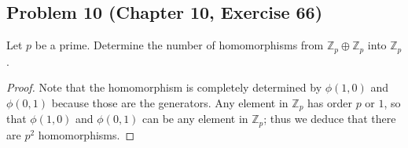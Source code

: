 \documentclass{article}
\begin{document}
\subsection*{Problem 10 (Chapter 10, Exercise 66)}
Let $p$ be a prime. Determine the number of homomorphisms from $\mathbb{Z}_p \oplus \mathbb{Z}_p$ into $\mathbb{Z}_p$.
\begin{proof}
Note that the homomorphism is completely determined by $\phi(1, 0)$ and $\phi(0, 1)$ because those are the generators. Any element in $\mathbb{Z}_p$ has order $p$ or $1$, so that $\phi(1, 0)$ and $\phi(0, 1)$ can be any element in $\mathbb{Z}_p$; thus we deduce that there are $p^2$ homomorphisms. 

\end{proof}
\end{document}
